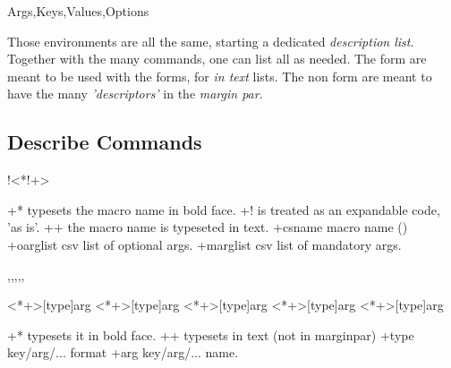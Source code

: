 \documentclass[dctools,english]{ufrgscca}
\begin{document}
\begin{Envs}{Args,Keys,Values,Options}
\begin{Syntax}%
\Macro{\begin{Args}}{}
\Macro{\begin{Args+}}{}
\Macro{\begin{Keys}}{}
\Macro{\begin{Keys+}}{}
\Macro{\begin{Values}}{}
\Macro{\begin{Values+}}{}
\Macro{\begin{Options}}{}
\Macro{\begin{Options+}}{}
\end{Syntax}

Those environments are all the same, starting a dedicated \emph{description list}. Together with the many  commands, one can list all  as needed. The \Key{+} form are meant to be used with the  forms, for \emph{in text} lists. The non \Key{+} form are meant to have the many \emph{'descriptors'} in the \emph{margin par}.
\end{Envs}

\subsection{Describe Commands}
\begin{Macros}{\DescribeMacro}
\begin{Syntax}%
\Macro!{\DescribeMacro}<*!+>{}
\end{Syntax}
\begin{Args+}
\DescribeKey+{*} typesets the macro name in bold face.
\DescribeKey+{!}  is treated as an expandable code, 'as is'.
\DescribeKey+{+} the macro name is typeseted in text.
\DescribeArg+{csname} macro name (\Macro{\detokenize}{})
\DescribeArg+{oarglist} csv list of optional args.
\DescribeArg+{marglist} csv list of mandatory args.
\end{Args+}
\end{Macros}

\begin{Macros}{\DescribeArg,\DescribeKey,\DescribeValue,\DescribeOption,\DescribePackage,}
\begin{Syntax}%
\Macro{\DescribeArg}<*+>[type]{arg}
\Macro{\DescribeKey}<*+>[type]{arg}
\Macro{\DescribeValue}<*+>[type]{arg}
\Macro{\DescribeOption}<*+>[type]{arg}
\Macro{\DescribePackage}<*+>[type]{arg}
\end{Syntax}
\begin{Args+}
\DescribeKey+{*} typesets it in bold face.
\DescribeKey+{+} typesets in text (not in marginpar)
\DescribeArg+{type} key/arg/... format
\DescribeArg+{arg} key/arg/... name.
\end{Args+}
\end{Macros}
\end{document}
